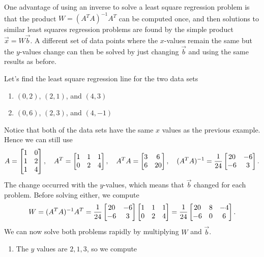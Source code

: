 One advantage of using an inverse to solve a least square regression problem is that the product $W=(A^TA)^{-1}A^T$ can be computed once, and then solutions to similar least squares regression problems are found by the simple product $\vec x=W\vec b$. 
A different set of data points where the $x$-values remain the same but the $y$-values change can then be solved by just changing $\vec b$ and using the same results as before. 

\begin{example}
Let's find the least square regression line for the two data sets 
\begin{enumerate}
	\item $(0,2)$, $(2,1)$, and $(4,3)$
	\item $(0,6)$, $(2,3)$, and $(4,-1)$
\end{enumerate}
Notice that both of the data sets have the same $x$ values as the previous example.  Hence we can still use 
$$
A = \begin{bmatrix}1&0\\1&2\\1&4\end{bmatrix},\quad
A^T= \begin{bmatrix}1&1&1\\0&2&4\end{bmatrix}, \quad
A^T A= \begin{bmatrix}3&6\\6&20\end{bmatrix}, \quad
(A^TA)^{-1}=\displaystyle\frac{1}{24}\begin{bmatrix}20&-6\\-6&3\end{bmatrix}.
$$ 
The change occurred with the $y$-values, which means that $\vec b$ changed for each problem.  Before solving either, we compute 
$$W=(A^TA)^{-1}A^T 
= \displaystyle\frac{1}{24}\begin{bmatrix}20&-6\\-6&3\end{bmatrix}\begin{bmatrix}1&1&1\\0&2&4\end{bmatrix}
= \displaystyle\frac{1}{24}\begin{bmatrix}20&8&-4\\-6&0&6\end{bmatrix}.
$$
We can now solve both problems rapidly by multiplying $W$ and $\vec b$.
\begin{enumerate}
	\item The $y$ values are $2,1,3$, so we compute

\end{enumerate}
\end{example}
